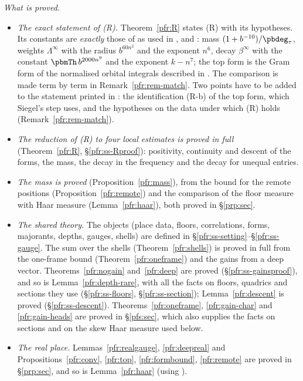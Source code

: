 \documentclass[10pt]{amsart}
\theoremstyle{definition}
\theoremstyle{remark}
\begin{document}
\emph{What is proved.}
\begin{itemize}
\item[(I)] \emph{The exact statement of \textup{(R)}.} Theorem~\ref{pfr:R} states \textup{(R)} with
its hypotheses. Its constants are \emph{exactly} those of {\cite[Theorem~3.51\,(R)]{P51}} as used in
{\cite[Theorem~3.50]{P51}}, {\cite[Lemma~3.52]{P51}} and {\cite[Theorem~3.53]{P51}}: mass $(1+b^{-10})/\pbdeg_\tau$,
weights $\Lambda^\infty$ with the radius $b^{60n^2}$ and the exponent $n^6$, decay $\beta^\infty$ with
the constant $\pbmTh\,b^{2000n^9}$ and the exponent $k-n^7$; the top form is the Gram form of the
normalised orbital integrals described in {\cite[\S3.3.7]{P51}}. The comparison is made term by term
in Remark~\ref{pfr:rem-match}. Two points have to be added to the statement printed in
{\cite[Theorem~3.51]{P51}}: the identification \textup{(R-b)} of the top form, which Siegel's step uses,
and the hypotheses on the data under which \textup{(R)} holds (Remark~\ref{pfr:rem-match}).
\item[(II)] \emph{The reduction of \textup{(R)} to four local estimates is proved in full}
(Theorem~\ref{pfr:R}, \S\ref{pfr:ss-Rproof}): positivity, continuity and descent of the forms, the
mass, the decay in the frequency and the decay for unequal entries.
\item[(III)] \emph{The mass is proved} (Proposition~\ref{pfr:mass}), from the bound for the remote
positions (Proposition~\ref{pfr:remote}) and the comparison of the floor measure with Haar measure
(Lemma~\ref{pfr:haar}), both proved in \S\ref{prp:sec}.
\item[(IV)] \emph{The shared theory.} The objects (place data, floors, correlations, forms,
majorants, depths, gauges, shells) are defined in \S\ref{pfr:ss-setting}--\S\ref{pfr:ss-gauge}. The
sum over the shells (Theorem~\ref{pfr:shells}) is proved in full from the one-frame bound
(Theorem~\ref{pfr:oneframe}) and the gains from a deep vector. Theorems~\ref{pfr:nogain} and~\ref{pfr:deep}
are proved (\S\ref{pfr:ss-gainsproof}), and so is Lemma~\ref{pfr:depth-rare}, with all the facts on
floors, quadrics and sections they use (\S\ref{pfr:ss-floors}, \S\ref{pfr:ss-section}); Lemma~\ref{pfr:descent}
is proved (\S\ref{pfr:ss-descent}). Theorems~\ref{pfr:oneframe}, \ref{pfr:gain-char} and \ref{pfr:gain-heads}
are proved in \S\ref{pfs:sec}, which also supplies the facts on sections and on the skew Haar measure used below.
\item[(V)] \emph{The real place.} Lemmas~\ref{pfr:realgauge}, \ref{pfr:deepreal} and
Propositions~\ref{pfr:conv}, \ref{pfr:top}, \ref{pfr:formbound}, \ref{pfr:remote} are proved in
\S\ref{prp:sec}, and so is Lemma~\ref{pfr:haar} (using {\cite[Lemmas~8.80 and~8.81]{P51}}).
\end{itemize}
\end{document}

